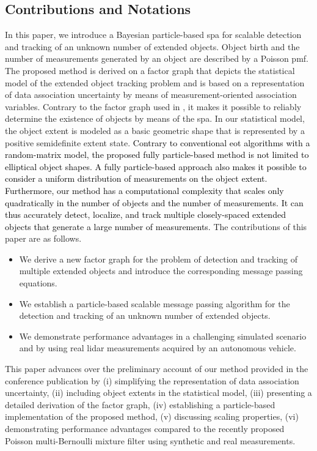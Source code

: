 \documentclass[10pt, twoside, romanappendices]{IEEEtran}
\providecommand{\rd}{\textcolor{black}}
\begin{document}
\subsection{Contributions and Notations}

In this paper, we introduce a Bayesian particle-based \ac{spa} for scalable detection and tracking of an unknown number of extended objects. Object birth and the number of measurements generated by an object are described by a Poisson \ac{pmf}. The proposed method is derived on a factor graph that depicts the statistical model of the extended object tracking problem and  is based on a representation of data association uncertainty by means of measurement-oriented association variables. Contrary to the factor graph used in \cite{MeyZheWin:C19}, it makes it possible to reliably determine the existence of objects by means of the \ac{spa}. In our statistical model, the object extent is modeled as a  basic geometric shape that is represented by a positive semidefinite extent state. \rd{Contrary to conventional \ac{eot} algorithms with a random-matrix model, the proposed fully particle-based method is not limited to elliptical object shapes. A fully particle-based approach also makes it possible to consider a uniform distribution of measurements on the object extent. Furthermore, our method has a computational complexity that scales only quadratically in the number of objects and the number of measurements. It can thus accurately detect, localize, and track multiple closely-spaced extended objects that generate a large number of measurements.} The contributions of this paper are as \vspace{.1mm} follows.
\begin{itemize}
\item We derive a new factor graph for the problem of detection and tracking of multiple extended objects and introduce the corresponding \vspace*{.5mm}message passing equations.
\item We establish a particle-based scalable message passing algorithm for the detection and tracking of an unknown number of extended objects.
\item We demonstrate performance advantages in a challenging simulated scenario and by using real lidar measurements acquired by an autonomous vehicle.
\end{itemize}

This paper advances over the preliminary account of our method provided in the conference publication \cite{MeyWil:C20} by (i) simplifying the representation of data association uncertainty, (ii) including object extents in the statistical model, (iii) presenting a detailed derivation of the factor graph, (iv) establishing a particle-based implementation of the proposed method, (v) discussing scaling properties, (vi) demonstrating performance advantages compared to the recently proposed Poisson multi-Bernoulli mixture filter \cite{GraFatSve:J19} using synthetic and real measurements.
\end{document}
